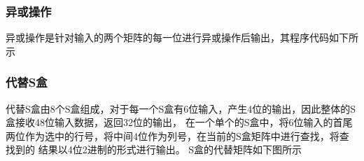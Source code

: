 \documentclass[a4paper,11pt,UTF8]{ctexart}
\begin{document}
        \subsubsection{异或操作}
            异或操作是针对输入的两个矩阵的每一位进行异或操作后输出，其程序代码如下所示
            
        \subsubsection{代替S盒}
            代替S盒由8个S盒组成，对于每一个S盒有6位输入，产生4位的输出，因此整体的S盒接收48位输入数据，返回32位的输出，
            在一个单个的S盒中，将6位输入的首尾两位作为选中的行号，将中间4位作为列号，在当前的S盒矩阵中进行查找，将查找到的
            结果以4位2进制的形式进行输出。
            S盒的代替矩阵如下图所示
\end{document}
